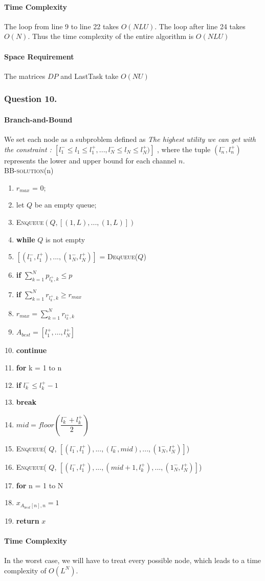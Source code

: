 \documentclass[11pt, oneside]{report}
\begin{document}
\paragraph{Time Complexity} The loop from line 9 to line 22 takes $O(NLU)$. The loop after line 24 takes $O(N)$. Thus the time complexity of the entire algorithm is $O(NLU)$
\paragraph{Space Requirement} The matrices $DP$ and LastTask take $O(NU)$

\subsubsection{Question 10. }
\paragraph{Branch-and-Bound} We set each node as a subproblem defined as \textit{The highest utility we can get with the constraint : $[ l_{1}^{-} \leq l_1 \leq l_{1}^{+},...,l_{N}^{-}\leq l_N \leq l_{N}^{+})]$ }, where the tuple $( l_n^{-}, l_n^{+} )$ represents the lower and upper bound for each channel $n$. \\

\noindent\textsc{BB-solution}(n)
\begin{enumerate}[1\ ]
\setlength{\topsep}{0.05ex}
\setlength{\itemsep}{0.05ex}
\item $r_{max}$ = 0;
\item let $Q$ be an empty queue;
\item \textsc{Enqueue}$(Q, [(1,L),...,(1,L)])$
\item \textbf{while} $Q$ is not empty
\item \qquad $[(l_1^{-},l_1^{+}),...,(1_N^{-},l_N^{+})]$ = \textsc{Dequeue}($Q$)
\item \qquad \textbf{if} $\sum_{k=1}^{N} p_{l_{k}^{+}, k} \leq p$
\item \qquad \qquad \textbf{if} $\sum_{k=1}^{N} r_{l_{k}^{+}, k} \geq r_{max}$
\item \qquad \qquad \qquad $r_{max} = \sum_{k=1}^{N} r_{l_{k}^{+}, k}$
\item \qquad \qquad \qquad $A_{best} = [l_1^{+},..., l_N^{+}]$
\item \qquad \qquad \textbf{continue}
\item \qquad \textbf{for} k = 1 to n
\item \qquad \qquad \textbf{if} $l_k^{-} \leq l_k^{+} - 1$
\item \qquad \qquad \qquad \textbf{break}
\item \qquad $mid = floor(\dfrac{l_k^{-} + l_k^{+}}{2})$
\item \qquad \textsc{Enqueue}( $Q$, $[(l_1^{-},l_1^{+}),...,(l_k^{-},mid),...,(1_N^{-},l_N^{+})]$)
\item \qquad \textsc{Enqueue}( $Q$, $[(l_1^{-},l_1^{+}),...,(mid+1,l_k^{+}),...,(1_N^{-},l_N^{+})]$)
\item \textbf{for} n = 1 to N
\item \qquad $x_{A_{best}[n],n} = 1$
\item \textbf{return} $x$
\end{enumerate}

\paragraph{Time Complexity} In the worst case, we will have to treat every possible node, which leads to a time complexity of $O(L^N)$. 
\end{document}
